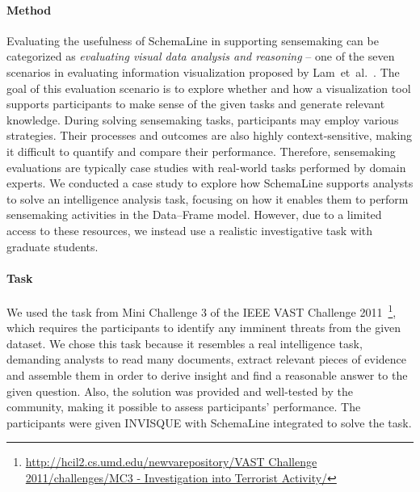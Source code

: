 \paragraph{Method}
Evaluating the usefulness of SchemaLine in supporting sensemaking can be categorized as \emph{evaluating visual data analysis and reasoning} -- one of the seven scenarios in evaluating information visualization proposed by Lam~et~al.~\cite{Lam2012}. The goal of this evaluation scenario is to explore whether and how a visualization tool supports participants to make sense of the given tasks and generate relevant knowledge. During solving sensemaking tasks, participants may employ various strategies. Their processes and outcomes are also highly context-sensitive, making it difficult to quantify and compare their performance. Therefore, sensemaking evaluations are typically case studies with real-world tasks performed by domain experts. We conducted a case study to explore how SchemaLine supports analysts to solve an intelligence analysis task, focusing on how it enables them to perform sensemaking activities in the Data--Frame model. However, due to a limited access to these resources, we instead use a realistic investigative task with graduate students.

\paragraph{Task}
We used the task from Mini Challenge 3 of the IEEE VAST Challenge 2011~\footnote{\url{http://hcil2.cs.umd.edu/newvarepository/VAST Challenge 2011/challenges/MC3 - Investigation into Terrorist Activity/}}, which requires the participants to identify any imminent threats from the given dataset. We chose this task because it resembles a real intelligence task, demanding analysts to read many documents, extract relevant pieces of evidence and assemble them in order to derive insight and find a reasonable answer to the given question. Also, the solution was provided and well-tested by the community, making it possible to assess participants' performance. The participants were given INVISQUE with SchemaLine integrated to solve the task.

